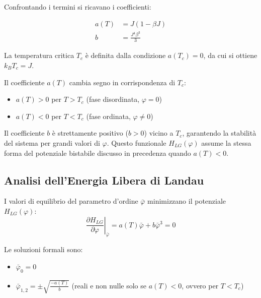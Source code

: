 Confrontando i termini si ricavano i coefficienti:
\begin{tcolorbox}[
    colback=colorA!5,      
    colframe=colorA,       
    arc=3mm,               
    boxrule=1.2pt
]
\begin{align}
a(T) &= J(1-\beta J) \\
b &= \frac{J^4 \beta^3}{3}
\end{align}
\end{tcolorbox}

La temperatura critica $T_c$ è definita dalla condizione $a(T_c)=0$, da cui si ottiene $k_B T_c = J$.

Il coefficiente $a(T)$ cambia segno in corrispondenza di $T_c$:
\begin{itemize}
    \item $a(T)>0$ per $T>T_c$ (fase disordinata, $\varphi=0$)
    \item $a(T)<0$ per $T<T_c$ (fase ordinata, $\varphi\neq0$)
\end{itemize}
Il coefficiente $b$ è strettamente positivo ($b>0$) vicino a $T_c$, garantendo la stabilità del sistema per grandi valori di $\varphi$. 
\noindent Questo funzionale $H_{LG}(\varphi)$ assume la stessa forma del potenziale bistabile discusso in precedenza quando $a(T)<0$.

\subsection{Analisi dell'Energia Libera di Landau}
I valori di equilibrio del parametro d'ordine $\bar{\varphi}$ minimizzano il potenziale $H_{LG}(\varphi)$:
\begin{equation} 
\left. \frac{\partial H_{LG}}{\partial\varphi}\right|_{\bar{\varphi}} = a(T)\bar{\varphi}+b\bar{\varphi}^{3}=0 
\end{equation}

Le soluzioni formali sono:
\begin{itemize}
    \item $\bar{\varphi}_{0}=0$
    \item $\bar{\varphi}_{1,2}=\pm\sqrt{\frac{-a(T)}{b}}$ (reali e non nulle solo se $a(T)<0$, ovvero per $T<T_c$)
\end{itemize}

